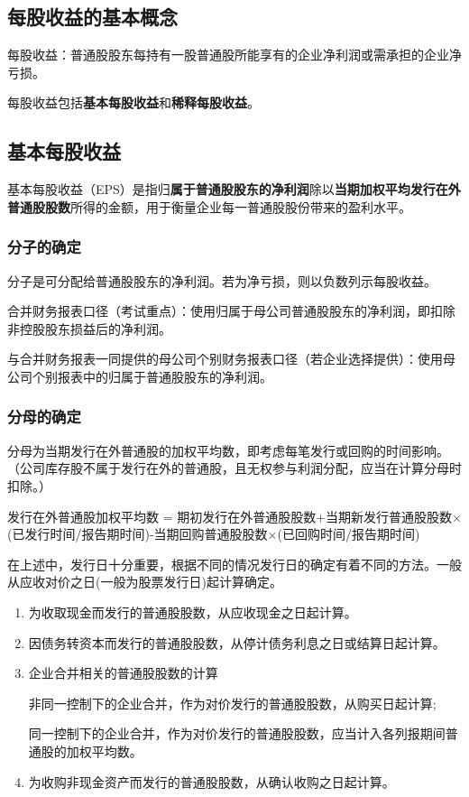 \documentclass[UTF8,12pt]{ctexart}
\numberwithin{equation}{section} %
\numberwithin{figure}{section}
\numberwithin{table}{section}
\begin{document}
	\subsection{每股收益的基本概念}
	每股收益：普通股股东每持有一股普通股所能享有的企业净利润或需承担的企业净亏损。
	
	每股收益包括\textbf{基本每股收益}和\textbf{稀释每股收益}。
	
	\subsection{基本每股收益}
	基本每股收益（EPS）是指归\textbf{属于普通股股东的净利润}除以\textbf{当期加权平均发行在外普通股股数}所得的金额，用于衡量企业每一普通股股份带来的盈利水平。
	\subsubsection{分子的确定}
	
	分子是可分配给普通股股东的净利润。若为净亏损，则以负数列示每股收益。
	
	合并财务报表口径（考试重点）：使用归属于母公司普通股股东的净利润，即扣除非控股股东损益后的净利润。
	
	与合并财务报表一同提供的母公司个别财务报表口径（若企业选择提供）：使用母公司个别报表中的归属于普通股股东的净利润。
	
	
	\subsubsection{分母的确定}
	
	分母为当期发行在外普通股的加权平均数，即考虑每笔发行或回购的时间影响。（公司库存股不属于发行在外的普通股，且无权参与利润分配，应当在计算分母时扣除。）
	
	发行在外普通股加权平均数 = 期初发行在外普通股股数+当期新发行普通股股数$\times$(已发行时间/报告期时间)-当期回购普通股股数$\times$(已回购时间/报告期时间)
	
	在上述中，发行日十分重要，根据不同的情况发行日的确定有着不同的方法。一般从应收对价之日(一般为股票发行日)起计算确定。
	\begin{enumerate}
		\item 为收取现金而发行的普通股股数，从应收现金之日起计算。
		
		\item 因债务转资本而发行的普通股股数，从停计债务利息之日或结算日起计算。
		
		\item 企业合并相关的普通股股数的计算
		
		非同一控制下的企业合并，作为对价发行的普通股股数，从购买日起计算;
		
		同一控制下的企业合并，作为对价发行的普通股股数，应当计入各列报期间普通股的加权平均数。
		
		\item 为收购非现金资产而发行的普通股股数，从确认收购之日起计算。
	\end{enumerate}
\end{document}
